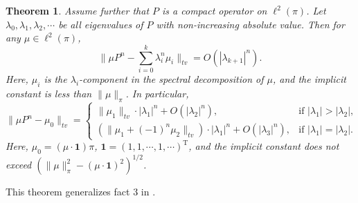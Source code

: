 \documentclass[a4]{amsart}
\newcommand{\T}{\mathrm{T}}
\newtheorem{theorem}{Theorem}
\theoremstyle{remark} \newtheorem{remark}[theorem]{Remark}
\begin{document}
\begin{theorem}\label{thm:main_thm_spec}
Assume further that $P$ is a compact operator on $\ell^2(\pi)$. Let $\lambda_0, \lambda_1, \lambda_2, \cdots$ be all eigenvalues of $P$ with non-increasing absolute value. Then for any $\mu \in \ell^2(\pi)$,
\[
\|\mu P^n - \sum_{i=0}^{k} \lambda_i^n \mu_i\|_{tv} = O(|\lambda_{k+1}|^{n}).
\]
Here, $\mu_i$ is the $\lambda_i$-component in the spectral decomposition of $\mu$, and the implicit constant is less than $\|\mu\|_\pi$. In particular,
\[
\|\mu P^n - \mu_0\|_{tv} = \begin{cases}
    \|\mu_1\|_{tv} \cdot |\lambda_1|^{n} + O(|\lambda_2|^{n}), & \text{if } |\lambda_1| > |\lambda_2|, \\
    (\|\mu_1 + (-1)^n \mu_2\|_{tv}) \cdot |\lambda_1|^{n} + O(|\lambda_3|^{n}), & \text{if } |\lambda_1| = |\lambda_2|.
  \end{cases}
\]
Here, $\mu_0 = (\mu \cdot \mathbf{1}) \pi$, $\mathbf{1} = (1, 1,\cdots, 1, \cdots)^\T$, and the implicit constant does not exceed $\left(\|\mu\|_\pi^2 - (\mu \cdot \mathbf{1})^2\right)^{1/2}$.
\end{theorem}
\vspace{\medskipamount}
This theorem generalizes fact 3 in \cite{rosenthal1995Convergence}.
\end{document}
